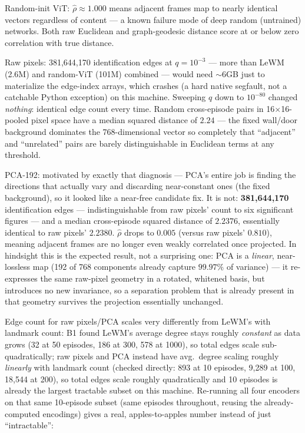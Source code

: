 \documentclass[11pt]{article}
\begin{document}
Random-init ViT: $\hat\rho \approx 1.000$ means adjacent frames map to nearly identical vectors
regardless of content --- a known failure mode of deep random (untrained) networks. Both raw
Euclidean and graph-geodesic distance score at or below zero correlation with true distance.

Raw pixels: 381{,}644{,}170 identification edges at $q=10^{-3}$ --- more than LeWM (2.6M) and
random-ViT (101M) combined --- would need $\sim$6GB just to materialize the edge-index arrays,
which crashes (a hard native segfault, not a catchable Python exception) on this machine. Sweeping
$q$ down to $10^{-80}$ changed \emph{nothing}: identical edge count every time. Random
cross-episode pairs in 16$\times$16-pooled pixel space have a median squared distance of $2.24$
--- the fixed wall/door background dominates the 768-dimensional vector so completely that
``adjacent'' and ``unrelated'' pairs are barely distinguishable in Euclidean terms at any
threshold.

PCA-192: motivated by exactly that diagnosis --- PCA's entire job is finding the directions that
actually vary and discarding near-constant ones (the fixed background), so it looked like a
near-free candidate fix. It is not: \textbf{381{,}644{,}170} identification edges ---
indistinguishable from raw pixels' count to six significant figures --- and a median cross-episode
squared distance of $2.2376$, essentially identical to raw pixels' $2.2380$. $\hat\rho$ drops to
$0.005$ (versus raw pixels' $0.810$), meaning adjacent frames are no longer even weakly
correlated once projected. In hindsight this is the expected result, not a surprising one: PCA is
a \emph{linear}, near-lossless map (192 of 768 components already capture $99.97\%$ of variance)
--- it re-expresses the same raw-pixel geometry in a rotated, whitened basis, but introduces no
new invariance, so a separation problem that is already present in that geometry survives the
projection essentially unchanged.

Edge count for raw pixels/PCA scales very differently from LeWM's with landmark count: B1 found
LeWM's average degree stays roughly \emph{constant} as data grows (32 at 50 episodes, 186 at 300,
578 at 1000), so total edges scale sub-quadratically; raw pixels and PCA instead have avg.\ degree
scaling roughly \emph{linearly} with landmark count (checked directly: 893 at 10 episodes, 9{,}289
at 100, 18{,}544 at 200), so total edges scale roughly quadratically and 10 episodes is already
the largest tractable subset on this machine. Re-running all four encoders on that same 10-episode
subset (same episodes throughout, reusing the already-computed encodings) gives a real,
apples-to-apples number instead of just ``intractable'':
\end{document}
